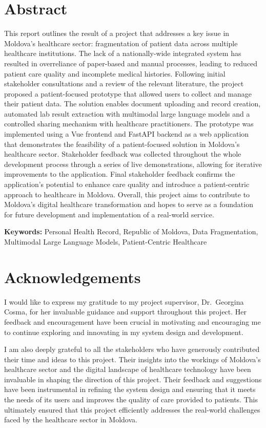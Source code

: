 \chapter*{Abstract}
This report outlines the result of a project that addresses a key issue in Moldova's healthcare sector: fragmentation of patient data across multiple healthcare institutions. The lack of a nationally-wide integrated system has resulted in overreliance of paper-based and manual processes, leading to reduced patient care quality and incomplete medical histories. Following initial stakeholder consultations and a review of the relevant literature, the project proposed a patient-focused prototype  that allowed users to collect and manage their patient data. The solution enables document uploading and record creation, automated lab result extraction with multimodal large language models and a controlled sharing mechanism with healthcare practitioners. The prototype was implemented using a Vue frontend and FastAPI backend as a web application that demonstrates the feasibility of a patient-focused solution in Moldova's healthcare sector. Stakeholder feedback was collected throughout the whole development process through a series of live demonstrations, allowing for iterative improvements to the application. Final stakeholder feedback confirms the application's potential to enhance care quality and introduce a patient-centric approach to healthcare in Moldova. Overall, this project aims to contribute to Moldova's digital healthcare transformation and hopes to serve as a foundation for future development and implementation of a real-world service.

\textbf{Keywords:} Personal Health Record, Republic of Moldova, Data Fragmentation, Multimodal Large Language Models, Patient-Centric Healthcare

\chapter*{Acknowledgements}
I would like to express my gratitude to my project supervisor, Dr.\ Georgina Cosma, for her invaluable guidance and support throughout this project. Her feedback and encouragement have been crucial in motivating and encouraging me to continue exploring and innovating in my system design and development.

I am also deeply grateful to all the stakeholders who have generously contributed their time and ideas to this project. Their insights into the workings of Moldova's healthcare sector and the digital landscape of healthcare technology have been invaluable in shaping the direction of this project. Their feedback and suggestions have been instrumental in refining the system design and ensuring that it meets the needs of its users and improves the quality of care provided to patients. This ultimately ensured that this project efficiently addresses the real-world challenges faced by the healthcare sector in Moldova.

